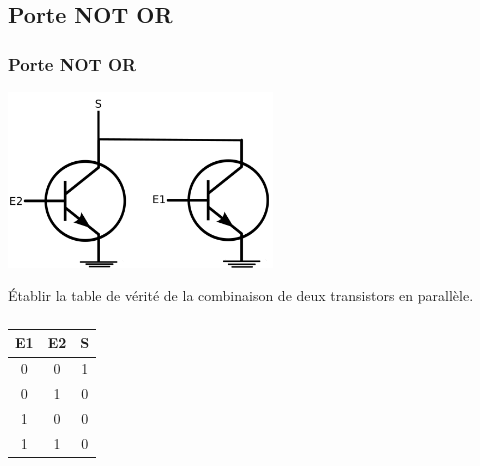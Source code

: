 \documentclass[svgnames,11pt]{beamer}
\begin{document}
\subsection{Porte NOT OR}
\begin{frame}
    \frametitle{Porte NOT OR}
    \begin{center}
        \centering
        \includegraphics[width=7cm]{ressources/schema-nor.png}
        \label{IMG}
    \end{center}

    \begin{activite}
        Établir la table de vérité de la combinaison de deux transistors en parallèle.
    \end{activite}
\end{frame}
\begin{frame}
    \frametitle{}

    \begin{center}
        \begin{tabular}{|c|c|c|}
            \hline
            E1 & E2 & S \\
            \hline
            0  & 0  & 1 \\
            \hline
            0  & 1  & 0 \\
            \hline
            1  & 0  & 0 \\
            \hline
            1  & 1  & 0 \\
            \hline
        \end{tabular}
    \end{center}

\end{frame}
\end{document}
